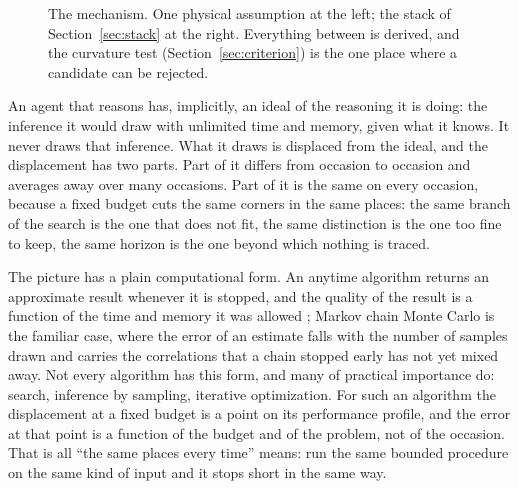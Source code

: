 \begin{figure}[t]
\centering
{}
\caption{The mechanism. One physical assumption at the left; the stack of Section~\ref{sec:stack} at the
right. Everything between is derived, and the curvature test (Section~\ref{sec:criterion}) is the one
place where a candidate can be rejected.}
\label{fig:mechanism}
\end{figure}

An agent that reasons has, implicitly, an ideal of the reasoning it is doing: the inference it would
draw with unlimited time and memory, given what it knows. It never draws that inference. What it draws
is displaced from the ideal, and the displacement has two parts. Part of it differs from occasion to
occasion and averages away over many occasions. Part of it is the same on every occasion, because a
fixed budget cuts the same corners in the same places: the same branch of the search is the one that
does not fit, the same distinction is the one too fine to keep, the same horizon is the one beyond
which nothing is traced.

The picture has a plain computational form. An anytime algorithm returns an approximate result whenever
it is stopped, and the quality of the result is a function of the time and memory it was allowed
\citep{dean1988,zilberstein1996}; Markov chain Monte Carlo is the familiar case, where the error of an estimate falls
with the number of samples drawn and carries the correlations that a chain stopped early has not yet
mixed away. Not every algorithm has this form, and many of practical importance do: search, inference
by sampling, iterative optimization. For such an algorithm the displacement at a fixed budget is a
point on its performance profile, and the error at that point is a function of the budget and of the
problem, not of the occasion. That is all ``the same places every time'' means: run the same bounded
procedure on the same kind of input and it stops short in the same way.

